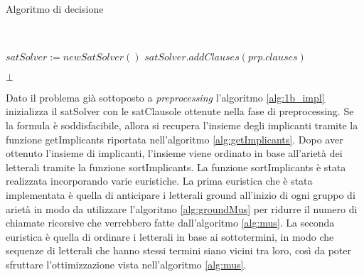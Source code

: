 \documentclass[./main.tex]{subfiles}
\begin{document}
\begin{algorithm}[H] \label{alg:1b_impl}
    \caption{Algoritmo di decisione}
    \\

$satSolver := newSatSolver()$\;
$satSolver.addClauses(prp.clauses)$\;

\Return $\bot$\;
\end{algorithm}

Dato il problema già sottoposto a \textit{preprocessing} l'algoritmo \ref{alg:1b_impl} inizializza il satSolver
con le satClausole ottenute nella fase di preprocessing. 
Se la formula è soddisfacibile, allora si recupera l'insieme degli implicanti
tramite la funzione getImplicants riportata nell'algoritmo \ref{alg:getImplicants}.
Dopo aver ottenuto l'insieme di implicanti, l'insieme viene ordinato in base all'arietà dei letterali tramite la funzione sortImplicants.
La funzione sortImplicants è stata realizzata incorporando varie euristiche.
La prima euristica che è stata implementata è quella di anticipare i letterali ground all'inizio di ogni gruppo di arietà in modo da utilizzare 
l'algoritmo \ref{alg:groundMus} per ridurre il numero di chiamate ricorsive che verrebbero fatte dall'algoritmo \ref{alg:mus}.
La seconda euristica è quella di ordinare i letterali in base ai sottotermini, in modo che sequenze di letterali
che hanno stessi termini siano vicini tra loro, così da poter sfruttare l'ottimizzazione vista nell'algoritmo \ref{alg:mus}.
\end{document}
